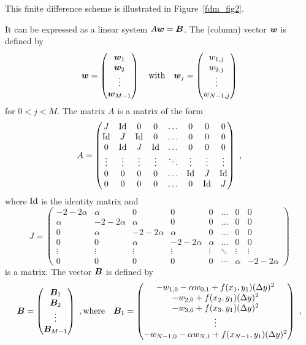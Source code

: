 This finite difference scheme is illustrated in Figure~\ref{fdm_fig2}.

It can be expressed as a linear system $A\bm{w} = \bm{B}$.
The (column) vector $\bm{w}$ is defined by
\[
\bm{w} = \begin{pmatrix}
\bm{w}_1 \\ \bm{w}_2 \\ \vdots \\ \bm{w}_{M-1}
\end{pmatrix}
\quad \text{with} \quad
\bm{w}_j =
\begin{pmatrix} w_{1,j} \\ w_{2,j} \\ \vdots \\ w_{N-1,j} \end{pmatrix}
\]
for $0 < j < M$.  The matrix $A$ is a  matrix of
the form
\[
A = \begin{pmatrix}
J & \operatorname{Id} & 0 & 0 & \ldots & 0 & 0 & 0 \\
\operatorname{Id} & J & \operatorname{Id} & 0 & \ldots & 0 & 0 & 0 \\
0 & \operatorname{Id} & J & \operatorname{Id} & \ldots & 0 & 0 & 0 \\
\vdots & \vdots & \vdots & \vdots & \ddots & \vdots & \vdots & \vdots \\
0 & 0 & 0 & 0 & \ldots & \operatorname{Id} & J & \operatorname{Id} \\
0 & 0 & 0 & 0 & \ldots & 0 & \operatorname{Id} & J
\end{pmatrix} \ ,
\]
where $\operatorname{Id}$ is the  identity matrix and
\begin{equation} \label{fdm_JE}
J = \begin{pmatrix}
-2-2\alpha & \alpha & 0 & 0 & 0 & \ldots & 0 & 0 \\
\alpha & -2-2\alpha & \alpha & 0 & 0 & \ldots & 0 & 0  \\
0 & \alpha & -2-2\alpha & \alpha & 0 & \ldots & 0 & 0 \\
0 & 0 & \alpha & -2-2\alpha & \alpha & \ldots & 0 & 0 \\
\vdots & \vdots & \vdots & \vdots & \vdots & \ddots & \vdots & \vdots \\
0 & 0 & 0 & 0 & 0 & \cdots & \alpha & -2-2\alpha
\end{pmatrix}    
\end{equation}
is a  matrix.
The vector $\bm{B}$ is defined by
\[
\bm{B} = \begin{pmatrix} \bm{B}_1 \\ \bm{B}_2 \\ \vdots \\
\bm{B}_{M-1} \end{pmatrix} \ ,
\text{where} \quad
\bm{B}_1 = \begin{pmatrix}
-w_{1,0} - \alpha w_{0,1} + f(x_1,y_1)(\Delta{y})^2\\
-w_{2,0} + f(x_2,y_1)(\Delta{y})^2 \\
-w_{3,0} + f(x_3,y_1)(\Delta{y})^2 \\
\vdots \\
-w_{N-1,0} -\alpha w_{N,1}+ f(x_{N-1},y_1)(\Delta{y})^2\\
\end{pmatrix}
\ ,
\]
